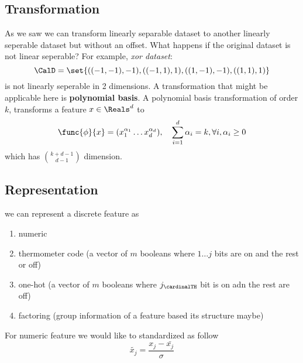 \subsection{Transformation}
As we saw we can transform linearly separable dataset to another linearly seperable dataset but without an offset. What happens if the original dataset is not linear seperable? For example, \textit{xor dataset}:
\begin{equation*}
    \CalD = \set{((-1,-1),-1), ((-1,1), 1) , ((1,-1),-1) , ((1,1),1)}
\end{equation*}
is not linearly seperable in 2 dimensions. A transformation that might be applicable here is \textbf{polynomial basis}. A polynomial basis transformation of order \(k\), transforms a feature \(x \in \Reals^d\) to
\begin{equation*}
    \func{\phi}{x} = ( x_1^{\alpha_1} \dots x_d^{\alpha_d}) , \quad \sum_{i = 1}^d \alpha_i = k , \forall i, \alpha_i \geq 0
\end{equation*}
which has \(\binom{k + d - 1}{d - 1}\) dimension.

\subsection{Representation}
we can represent a discrete feature as
\begin{enumerate}
    \item numeric
    \item thermometer code (a vector of \(m\) booleans where \(1\dots j\) bits are on and the rest or off)
    \item one-hot (a vector of \(m\) booleans where \(j_{\cardinalTH}\) bit is on adn the rest are off)
    \item factoring (group information of a feature based its structure maybe)
\end{enumerate}

For numeric feature we would like to standardized as follow
\begin{equation*}
    \tilde{x_j}  = \dfrac{x_j - \bar{x_j}}{\sigma}
\end{equation*}